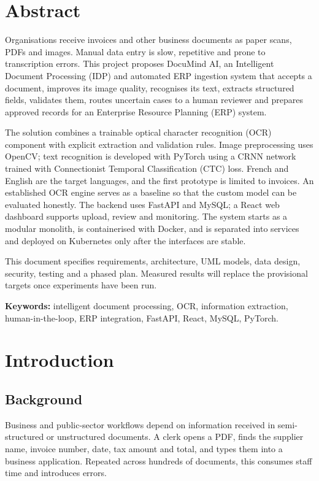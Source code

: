 \documentclass[11pt,a4paper]{report}
\newcommand{\projname}{DocuMind AI}
\begin{document}
\chapter*{Abstract}
Organisations receive invoices and other business documents as paper scans, PDFs and images. Manual data entry is slow, repetitive and prone to transcription errors. This project proposes \projname, an Intelligent Document Processing (IDP) and automated ERP ingestion system that accepts a document, improves its image quality, recognises its text, extracts structured fields, validates them, routes uncertain cases to a human reviewer and prepares approved records for an Enterprise Resource Planning (ERP) system.

The solution combines a trainable optical character recognition (OCR) component with explicit extraction and validation rules. Image preprocessing uses OpenCV; text recognition is developed with PyTorch using a CRNN network trained with Connectionist Temporal Classification (CTC) loss. French and English are the target languages, and the first prototype is limited to invoices. An established OCR engine serves as a baseline so that the custom model can be evaluated honestly. The backend uses FastAPI and MySQL; a React web dashboard supports upload, review and monitoring. The system starts as a modular monolith, is containerised with Docker, and is separated into services and deployed on Kubernetes only after the interfaces are stable.

This document specifies requirements, architecture, UML models, data design, security, testing and a phased plan. Measured results will replace the provisional targets once experiments have been run.

\medskip\noindent\textbf{Keywords:} intelligent document processing, OCR, information extraction, human-in-the-loop, ERP integration, FastAPI, React, MySQL, PyTorch.
\clearpage
\tableofcontents
\clearpage
\listoffigures
\clearpage
\listoftables
\clearpage
{}
\setcounter{page}{1}

\chapter{Introduction}
\section{Background}
Business and public-sector workflows depend on information received in semi-structured or unstructured documents. A clerk opens a PDF, finds the supplier name, invoice number, date, tax amount and total, and types them into a business application. Repeated across hundreds of documents, this consumes staff time and introduces errors.
\end{document}

